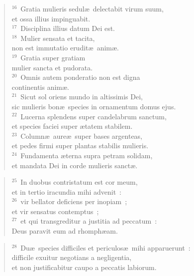 \begin{flushleft}
\begin{verse}
${}^{16}$~Gratia mulieris sedul\ae\ delectabit virum suum,\\ et ossa illius impinguabit.\\
${}^{17}$~Disciplina illius datum Dei est.\\
${}^{18}$~Mulier sensata et tacita,\\ non est immutatio erudit\ae\ anim\ae .\\
${}^{19}$~Gratia super gratiam\\ mulier sancta et pudorata.\\
${}^{20}$~Omnis autem ponderatio non est digna\\ continentis anim\ae .\\
${}^{21}$~Sicut sol oriens mundo in altissimis Dei,\\ sic mulieris bon\ae\ species in ornamentum domus ejus.\\
${}^{22}$~Lucerna splendens super candelabrum sanctum,\\ et species faciei super \ae tatem stabilem.\\
${}^{23}$~Column\ae\ aure\ae\ super bases argenteas,\\ et pedes firmi super plantas stabilis mulieris.\\
${}^{24}$~Fundamenta \ae terna supra petram solidam,\\ et mandata Dei in corde mulieris sanct\ae .\end{verse}\end{flushleft}


\begin{flushleft}\begin{verse}${}^{25}$~In duobus contristatum est cor meum,\\ et in tertio iracundia mihi advenit~:\\
${}^{26}$~vir bellator deficiens per inopiam~;\\ et vir sensatus contemptus~;\\
${}^{27}$~et qui transgreditur a justitia ad peccatum~:\\ Deus paravit eum ad rhomph\ae am.\end{verse}\end{flushleft}


\begin{flushleft}\begin{verse}${}^{28}$~Du\ae\ species difficiles et periculos\ae\ mihi apparuerunt~:\\ difficile exuitur negotians a negligentia,\\ et non justificabitur caupo a peccatis labiorum.\end{verse}\end{flushleft}


